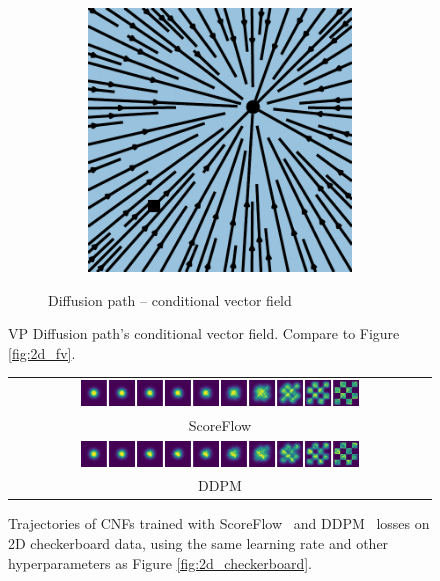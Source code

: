 \documentclass{article}
\begin{document}
\begin{figure}
\begin{subfigure}[t]{0.43\linewidth}
\begin{subfigure}[t]{0.23\linewidth}
        \vspace{-1.5em}
        \caption*{}
    \end{subfigure}
    \begin{subfigure}[t]{0.23\linewidth}
        \centering
        \includegraphics[width=\linewidth]{figures/plots/2d_vf_flow_match_dif_3.pdf}
        \vspace{-1.5em}
        \caption*{}
    \end{subfigure}
\caption*{Diffusion path -- conditional vector field}
\end{subfigure}
\caption{VP Diffusion path's conditional vector field. Compare to Figure \ref{fig:2d_fv}. }
\label{fig:2d_diff_fv}
\end{figure}


\begin{figure}
\centering
\begin{tabular}{c}
    \includegraphics[width=0.68\textwidth]{figures/2d_checker/2d_checkerboard_scoreflow_dif.png}   \\
     \scriptsize{ScoreFlow}\\ 
     \includegraphics[width=0.68\textwidth]{figures/2d_checker/2d_checkerboard_noise_dif.png}   \\
     \scriptsize{DDPM}
\end{tabular}
    \caption{Trajectories of CNFs trained with ScoreFlow~\citep{song2021maximum} and DDPM~\citep{ho2020denoising} losses on 2D checkerboard data, using the same learning rate and other hyperparameters as Figure \ref{fig:2d_checkerboard}. }
    \label{fig:2d_checkerboard_ScoreFlow}
\end{figure}
\end{document}
